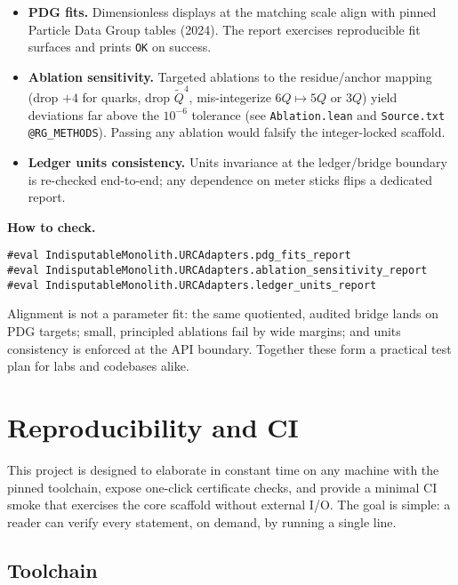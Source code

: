 \documentclass[11pt,a4paper,twoside]{article}
\numberwithin{equation}{section}
\theoremstyle{customthm}
\theoremstyle{customdef}
\theoremstyle{customrem}
\begin{document}
\begin{itemize}[leftmargin=*]
  \item \textbf{PDG fits.} Dimensionless displays at the matching scale align with pinned Particle Data Group tables (2024). The report exercises reproducible fit surfaces and prints \texttt{OK} on success.
  \item \textbf{Ablation sensitivity.} Targeted ablations to the residue/anchor mapping (drop \(+4\) for quarks, drop \(\tilde Q^4\), mis-integerize \(6Q\mapsto 5Q\) or \(3Q\)) yield deviations far above the \(10^{-6}\) tolerance (see \texttt{Ablation.lean} and \texttt{Source.txt @RG\_METHODS}). Passing any ablation would falsify the integer-locked scaffold.
  \item \textbf{Ledger units consistency.} Units invariance at the ledger/bridge boundary is re-checked end-to-end; any dependence on meter sticks flips a dedicated report.
\end{itemize}

\noindent\textbf{How to check.}
\begin{lstlisting}
#eval IndisputableMonolith.URCAdapters.pdg_fits_report
#eval IndisputableMonolith.URCAdapters.ablation_sensitivity_report
#eval IndisputableMonolith.URCAdapters.ledger_units_report
\end{lstlisting}

\begin{resultbox}[Meaning]
Alignment is not a parameter fit: the same quotiented, audited bridge lands on PDG targets; small, principled ablations fail by wide margins; and units consistency is enforced at the API boundary. Together these form a practical test plan for labs and codebases alike.
\end{resultbox}

\section{Reproducibility and CI}\label{sec:repro}

This project is designed to elaborate in constant time on any machine with the pinned toolchain, expose one-click certificate checks, and provide a minimal CI smoke that exercises the core scaffold without external I/O. The goal is simple: a reader can verify every statement, on demand, by running a single line.

\subsection{Toolchain}\label{subsec:repro-toolchain}
\end{document}
